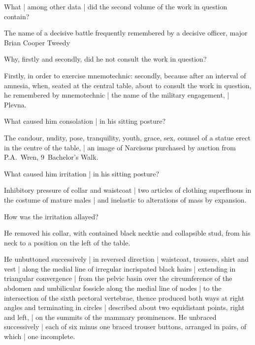 What |
among other data |
did the second volume of the work in question contain?

\Memories
The name of a decisive battle
frequently remembered by a decisive officer,
major Brian Cooper Tweedy


Why,
firstly and secondly,
did he not consult the work in question?

\Bloom
Firstly, in order to exercise mnemotechnic:
secondly, because after an interval of amnesia,
when, seated at the central table,
about to consult the work in question,
he remembered by mnemotechnic |
the name of the military engagement, |
Plevna.


What caused him consolation |
in his sitting posture?

\Household
The candour, nudity, pose, tranquility, youth, grace, sex,
counsel of a statue erect in the centre of the table, |
an image of Narcissus purchased by auction
from P.A.~Wren, 9~Bachelor's Walk.



What caused him irritation |
in his sitting posture?

\Science
Inhibitory pressure of collar
and waistcoat
 |
two articles of clothing superfluous in the costume of mature males |
and inelastic to alterations of mass by expansion.



How was the irritation allayed?

\Factual
He removed his collar,
with contained black necktie and collapsible stud,
from his neck to a position on the left of the table.

\Science
He unbuttoned successively |
in reversed direction |
waistcoat, trousers, shirt and vest |
along the medial line of irregular incrispated black hairs |
extending in triangular convergence |
from the pelvic basin over the circumference of the abdomen
and umbilicular fossicle along the medial line of nodes |
to the intersection of the sixth pectoral vertebrae,
thence produced both ways at right angles and terminating in circles |
described about two equidistant points,
right and left, |
on the summits of the mammary prominences.
He unbraced successively |
each of six minus one braced trouser buttons,
arranged in pairs,
of which |
one incomplete.



